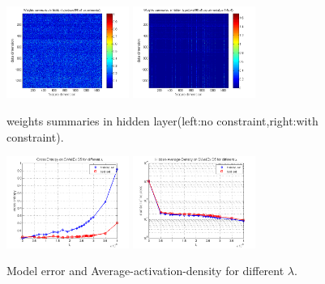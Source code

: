 \begin{figure}
\includegraphics[width=4cm,height=3cm]{figure/Weights_summaries_in_hidden_laye_swell_exp}
\includegraphics[width=4cm,height=3cm]{figure/Weights_summaries_in_hidden_laye_swell_exp_sc_3dot5_e_neg_5}
\caption{weights summaries in hidden layer(left:no constraint,right:with constraint).}
\end{figure}

\begin{figure}
\includegraphics[width=4cm,height=3cm]{figure/Cross_Entropy_on_SWellEx_S5_for_different_lambda}
\includegraphics[width=4cm,height=3cm]{figure/Hidden_Average_Density_on_SWellEx_S5_for_different_lambda}
\caption{Model error and Average-activation-density for different $\lambda $.}
\end{figure}



